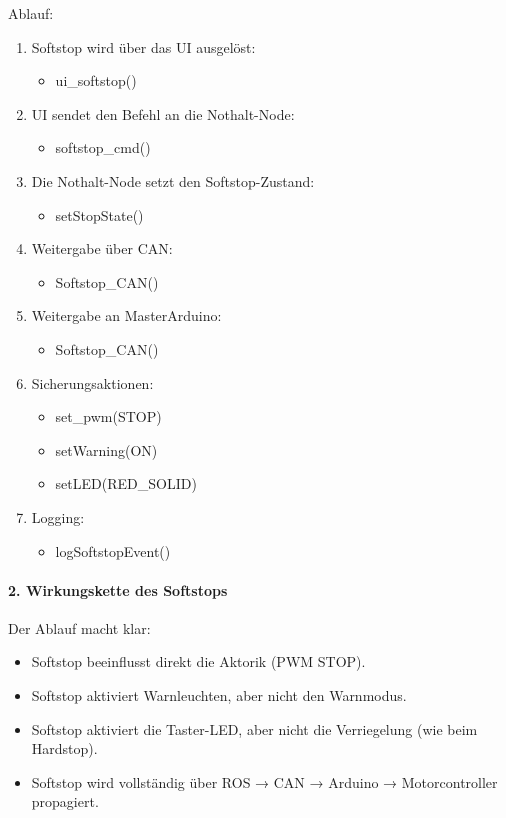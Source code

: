 Ablauf:
\begin{enumerate}
    \item Softstop wird über das UI ausgelöst:
    \begin{itemize}
        \item ui\_softstop()
    \end{itemize}
    \item UI sendet den Befehl an die Nothalt-Node:
    \begin{itemize}
        \item softstop\_cmd()
    \end{itemize}
    \item Die Nothalt-Node setzt den Softstop-Zustand:
    \begin{itemize}
        \item setStopState()
    \end{itemize}
    \item Weitergabe über CAN:
    \begin{itemize}
        \item Softstop\_CAN()
    \end{itemize}
    \item Weitergabe an MasterArduino:
    \begin{itemize}
        \item Softstop\_CAN()
    \end{itemize}
    \item Sicherungsaktionen:
    \begin{itemize}
        \item set\_pwm(STOP)
        \item setWarning(ON)
        \item setLED(RED\_SOLID)
    \end{itemize}
    \item Logging:
    \begin{itemize}
        \item logSoftstopEvent()
    \end{itemize}
\end{enumerate}

\paragraph{2. Wirkungskette des Softstops}

\quad Der Ablauf macht klar:
\begin{itemize}
    \item \ac{Softstop} beeinflusst direkt die Aktorik (PWM STOP).
    \item \ac{Softstop} aktiviert Warnleuchten, aber nicht den Warnmodus.
    \item \ac{Softstop} aktiviert die Taster-LED, aber nicht die Verriegelung (wie beim \ac{Hardstop}).
    \item \ac{Softstop} wird vollständig über ROS → CAN → Arduino → Motorcontroller propagiert.
\end{itemize}

